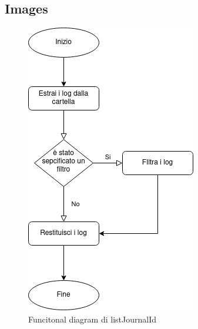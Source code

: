 \documentclass[12pt, a4paper]{article}
\begin{document}
\subsection{Images}
  \begin{figure}
    \includegraphics[width=\linewidth]{listJournalIds.jpg}
    \caption{Funcitonal diagram di listJournalId}
    \label{fig:listJournalIdsDiagram}
  \end{figure}
\end{document}
